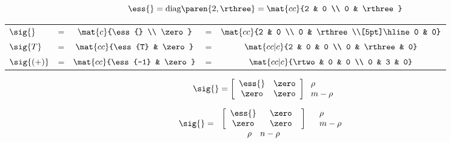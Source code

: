 \documentclass[10pt]{newsiambook}
\begin{document}
\clearpage
\break

\begin{equation*}
  \ess{} = \text{diag}\paren{2,\rthree} = \mat{cc}{2 & 0 \\ 0 & \rthree}
\end{equation*}

\begin{table}[htdp]
\begin{center}
\begin{tabular}{lcccc}
  $\sig{}$   &=& $\mat{c} {\ess{} \\ \zero}$  &=& $\mat{cc}  {2 & 0 \\ 0 & \rthree \\[5pt]\hline 0 & 0}$\\[15pt]
  $\sig{T}$  &=& $\mat{cc}{\ess{T}  & \zero}$ &=& $\mat{cc|c}{2 & 0 & 0 \\ 0 & \rthree & 0}$\\[5pt]
  $\sig{(+)}$&=& $\mat{cc}{\ess{-1} & \zero}$ &=& $\mat{cc|c}{\rtwo & 0 & 0 \\ 0 & 3 & 0}$\\[15pt]
\end{tabular}
\end{center}
\label{default}
\end{table}%


\begin{equation}
  \sig{} = 
  \left[
    \begin{array}{cc}
      \ess{} & \zero \\
      \zero  & \zero
    \end{array}
  \right]
  \left.
    \begin{array}{l}
    \rho \\
    m-\rho
    \end{array}
  \right.
\end{equation}


\begin{equation}
  \sig{} = \left.
  \begin{array}{cc}
  \left[
    \begin{array}{cc}
      \ess{} & \phantom{n}\zero\phantom{n} \\
      \zero  & \phantom{n}\zero\phantom{n}
    \end{array}
  \right] &
  \left.
    \begin{array}{l}
    \rho \\
    m-\rho
    \end{array}
  \right.
  \\
  \left.
  \begin{array}{cc}
  \rho & n-\rho
  \end{array}
  \right.
  \end{array}
  \right.
\end{equation}
\end{document}
